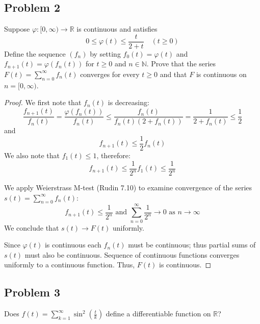 \documentclass{article}
\newcommand{\R}{\mathbb{R}}
\newcommand{\N}{\mathbb{N}}
\begin{document}
\subsection*{Problem 2}

\begin{tcolorbox}
Suppose $\varphi : [0, \infty) \to \R$ is continuous and satisfies
\[ 0 \leq \varphi(t) \leq \frac{t}{2+t} \quad (t \geq 0)\]
Define the sequence $(f_n)$ by setting $f_0(t) = \varphi(t)$ and $f_{n+1}(t) = \varphi(f_n(t))$ for $t \geq 0$ and $n \in \N$.
Prove that the series $F(t) = \sum_{n=0}^{\infty} f_n(t)$ converges for every $t \geq 0$ and that $F$ is continuous on $n=[0, \infty)$.
\end{tcolorbox}

\begin{proof}

We first note that $f_n(t)$ is decreasing:
\[
\frac{f_{n+1}(t)}{f_n(t)} = \frac{\varphi(f_n(t))}{f_n(t)} \leq \frac{f_n(t)}{f_n(t)(2+f_n(t))} = \frac{1}{2+f_n(t)} \leq \frac{1}{2} 
\]
and 
\[ f_{n+1}(t) \leq \frac{1}{2} f_n(t) \]
We also note that $f_1(t) \leq 1$, therefore:
\[ f_{n+1}(t) \leq \frac{1}{2^n} f_1(t) \leq \frac{1}{2^n} \]

We apply Weierstrass M-test (Rudin 7.10) to examine convergence of the series $s(t) = \sum_{n=0}^{\infty} f_n(t)$:
\[
f_{n+1}(t) \leq \frac{1}{2^n} \text{ and $\sum_{n=0}^{\infty} \frac{1}{2^n} \to 0$ as $n \to \infty$}
\]
We conclude that $s(t) \to F(t)$ uniformly.

Since $\varphi(t)$ is continuous each $f_n(t)$ must be continuous; thus partial sums of $s(t)$ must also be continuous.
Sequence of continuous functions converges uniformly to a continuous function.
Thus, $F(t)$ is continuous.

\end{proof}


\subsection*{Problem 3}

\begin{tcolorbox}
Does $f(t) = \sum_{k=1}^{\infty} \sin^2 \left( \frac{t}{k} \right)$ define a differentiable function on $\R$?
\end{tcolorbox}
\end{document}
